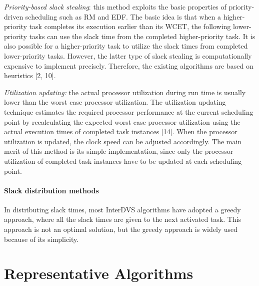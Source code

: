 \documentclass[10pt,article]{IEEEtran}
\begin{document}


\emph{Priority-based slack stealing}: this method exploits the basic  properties of  priority-driven scheduling such as  RM and EDF. The basic idea is that when a higher-priority task completes its execution earlier than its WCET, the following lower-priority tasks  can use the  slack time from the completed higher-priority task.  It is also possible for a higher-priority task to utilize the slack times from completed lower-priority tasks.  However, the latter type of slack stealing is computationally expensive to implement precisely.  Therefore, the existing algorithms are based on heuristics [2, 10].

\emph{Utilization updating:} the actual processor utilization during run time is usually lower than the worst case processor utilization. The utilization updating technique estimates the required processor performance at the current scheduling point by recalculating the expected worst case processor utilization using the actual execution times of completed task instances [14].   When the processor utilization is updated, the clock speed can be adjusted accordingly. The main merit of this method is its simple implementation, since only the processor utilization of completed task instances have to be updated at each scheduling point.

\paragraph{Slack distribution methods} In distributing slack times, most InterDVS algorithms have adopted a greedy approach, where all the slack times are given to the next activated task. This  approach is not an optimal solution, but the greedy approach is widely used because of its simplicity.


\section{Representative Algorithms} \label{hard-rt-algs}

\end{document}
